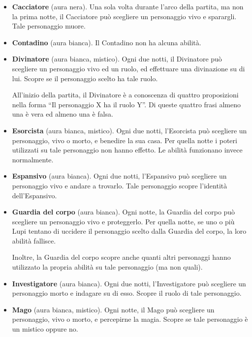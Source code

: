 \documentclass[a4paper,10pt]{article}
\begin{document}
\begin{itemize}
	
	\item {\bf Cacciatore} (aura nera). Una sola volta durante l'arco della partita, ma non la prima notte, il Cacciatore può scegliere un personaggio vivo e sparargli. Tale personaggio muore.
	
	\item {\bf Contadino} (aura bianca). Il Contadino non ha alcuna abilità.

	\item {\bf Divinatore} (aura bianca, mistico). Ogni due notti, il Divinatore può scegliere un personaggio vivo ed un ruolo, ed effettuare una divinazione su di lui. Scopre se il personaggio scelto ha tale ruolo.
	
	All'inizio della partita, il Divinatore è a conoscenza di quattro proposizioni nella forma ``Il personaggio X ha il ruolo Y''. Di queste quattro frasi almeno una è vera ed almeno una è falsa.

	\item {\bf Esorcista} (aura bianca, mistico). Ogni due notti, l'Esorcista può scegliere un personaggio, vivo o morto, e benedire la sua casa. Per quella notte i poteri utilizzati su tale personaggio non hanno effetto. Le abilità funzionano invece normalmente.
 
	\item {\bf Espansivo} (aura bianca). Ogni due notti, l'Espansivo può scegliere un personaggio vivo e andare a trovarlo. Tale personaggio scopre l'identità dell'Espansivo.

	\item {\bf Guardia del corpo} (aura bianca). Ogni notte, la Guardia del corpo può scegliere un personaggio vivo e proteggerlo. Per quella notte, se uno o più Lupi tentano di uccidere il personaggio scelto dalla Guardia del corpo, la loro abilità fallisce.

	Inoltre, la Guardia del corpo scopre anche quanti altri personaggi hanno utilizzato la propria abilità su tale personaggio (ma non quali).
 
	\item {\bf Investigatore} (aura bianca). Ogni due notti, l'Investigatore può scegliere un personaggio morto e indagare su di esso. Scopre il ruolo di tale personaggio.

	\item {\bf Mago} (aura bianca, mistico). Ogni notte, il Mago può scegliere un personaggio, vivo o morto, e percepirne la magia. Scopre se tale personaggio è un mistico oppure no.
 

\end{itemize}
\end{document}

